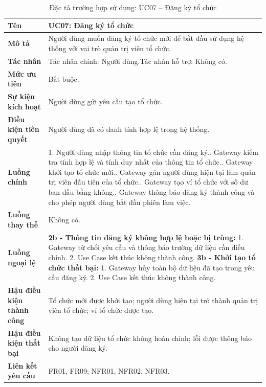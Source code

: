 \begin{longtable}{|L{4.2cm}|L{9.5cm}|}
\caption[Đặc tả UC07]{Đặc tả trường hợp sử dụng: UC07 -- Đăng ký tổ chức} \\\hline
\textbf{Tên} & UC07: Đăng ký tổ chức \\\hline
\textbf{Mô tả} & Người dùng muốn đăng ký tổ chức mới để bắt đầu sử dụng hệ thống với vai trò quản trị viên tổ chức.\\\hline
\textbf{Tác nhân} & Tác nhân chính: Người dùng.\newline Tác nhân hỗ trợ: Không có.\\\hline
\textbf{Mức ưu tiên} & Bắt buộc.\\\hline
\textbf{Sự kiện kích hoạt} & Người dùng gửi yêu cầu tạo tổ chức.\\\hline
\textbf{Điều kiện tiên quyết} & Người dùng đã có danh tính hợp lệ trong hệ thống.\\\hline
\textbf{Luồng chính} &
1. Người dùng nhập thông tin tổ chức cần đăng ký.. Gateway kiểm tra tính hợp lệ và tính duy nhất của thông tin tổ chức.. Gateway khởi tạo tổ chức mới.. Gateway gán người dùng hiện tại làm quản trị viên đầu tiên của tổ chức.. Gateway tạo ví tổ chức với số dư ban đầu bằng không.. Gateway thông báo đăng ký thành công và cho phép người dùng bắt đầu phiên làm việc.\\\hline
\textbf{Luồng thay thế} &
Không có.\\\hline
\textbf{Luồng ngoại lệ} &
\textbf{2b - Thông tin đăng ký không hợp lệ hoặc bị trùng:} 1. Gateway từ chối yêu cầu và thông báo trường dữ liệu cần điều chỉnh. 2. Use Case kết thúc không thành công.\newline
\textbf{3b - Khởi tạo tổ chức thất bại:} 1. Gateway hủy toàn bộ dữ liệu đã tạo trong yêu cầu đăng ký. 2. Use Case kết thúc không thành công.\\\hline
\textbf{Hậu điều kiện thành công} & Tổ chức mới được khởi tạo; người dùng hiện tại trở thành quản trị viên tổ chức; ví tổ chức được tạo.\\\hline
\textbf{Hậu điều kiện thất bại} & Không tạo dữ liệu tổ chức không hoàn chỉnh; lỗi được thông báo cho người đăng ký.\\\hline
\textbf{Liên kết yêu cầu} & FR01, FR09; NFR01, NFR02, NFR03.\\\hline
\end{longtable}


